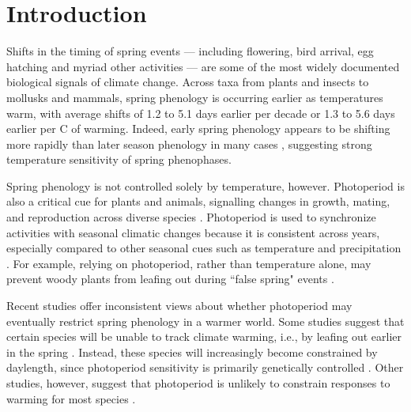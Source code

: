 \documentclass{article}
\begin{document}
\section*{Introduction}
\par Shifts in the timing of spring events --- including flowering, bird arrival, egg hatching and myriad other activities --- are some of the most widely documented biological signals of climate change. Across taxa from plants and insects to mollusks and mammals, spring phenology is occurring earlier as temperatures warm, with average shifts of 1.2 to 5.1 days earlier per decade \citep{bradley1999,parmesan2003, root2003} or 1.3 to 5.6 days earlier per \degree C of warming\citep{wolkovich2012,polgar2013}. Indeed, early spring phenology appears to be shifting more rapidly than later season phenology in many cases \citep{bradley1999,menzel2006}, suggesting strong temperature sensitivity of spring phenophases.

\par Spring phenology is not controlled solely by temperature, however. Photoperiod is also a critical cue for plants and animals, signalling changes in growth, mating, and reproduction across diverse species \citep[e.g.,][]{Howe:1996,flynn2018,solbakken1994,mcallan2006,lagercrantz2009}. Photoperiod is used to synchronize activities with seasonal climatic changes \citep[e.g.,][]{Hsu:2011,Singh:2017,Basler:2012} because it is consistent across years, especially compared to other seasonal cues such as temperature and precipitation \citep{saikkonen2012}. For example, relying on photoperiod, rather than temperature alone, may prevent woody plants from leafing out during ``false spring" events \citep[unusually warm periods during winter that are followed by a return of cold temperatures][] {Gu2008}. 

\par Recent studies offer inconsistent views about whether photoperiod may eventually restrict spring phenology in a warmer world. Some studies suggest that certain species will be unable to track climate warming, i.e., by leafing out earlier in the spring \citep{koerner2010b,way2015}. Instead, these species will increasingly become constrained by daylength, since photoperiod sensitivity is primarily genetically controlled \citep{bradshaw2008}. Other studies, however, suggest that photoperiod is unlikely to constrain responses to warming for most species \citep{zohner2016,chuine2010}.
\end{document}
